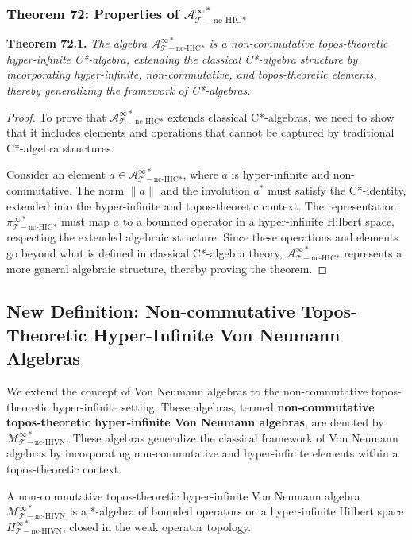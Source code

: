 \documentclass{article}
\begin{document}
\subsubsection{Theorem 72: Properties of \(\mathcal{A}_{\mathcal{T}-\text{nc-HIC*}}^{\infty *}\)}
\textbf{Theorem 72.1.} \textit{The algebra \(\mathcal{A}_{\mathcal{T}-\text{nc-HIC*}}^{\infty *}\) is a non-commutative topos-theoretic hyper-infinite C*-algebra, extending the classical C*-algebra structure by incorporating hyper-infinite, non-commutative, and topos-theoretic elements, thereby generalizing the framework of C*-algebras.}

\begin{proof}
To prove that \(\mathcal{A}_{\mathcal{T}-\text{nc-HIC*}}^{\infty *}\) extends classical C*-algebras, we need to show that it includes elements and operations that cannot be captured by traditional C*-algebra structures.

Consider an element \(a \in \mathcal{A}_{\mathcal{T}-\text{nc-HIC*}}^{\infty *}\), where \(a\) is hyper-infinite and non-commutative. The norm \(\|a\|\) and the involution \(a^*\) must satisfy the C*-identity, extended into the hyper-infinite and topos-theoretic context. The representation \(\pi_{\mathcal{T}-\text{nc-HIC*}}^{\infty *}\) must map \(a\) to a bounded operator in a hyper-infinite Hilbert space, respecting the extended algebraic structure. Since these operations and elements go beyond what is defined in classical C*-algebra theory, \(\mathcal{A}_{\mathcal{T}-\text{nc-HIC*}}^{\infty *}\) represents a more general algebraic structure, thereby proving the theorem.
\end{proof}

\subsection{New Definition: Non-commutative Topos-Theoretic Hyper-Infinite Von Neumann Algebras}
We extend the concept of Von Neumann algebras to the non-commutative topos-theoretic hyper-infinite setting. These algebras, termed \textbf{non-commutative topos-theoretic hyper-infinite Von Neumann algebras}, are denoted by \(\mathcal{M}_{\mathcal{T}-\text{nc-HIVN}}^{\infty *}\). These algebras generalize the classical framework of Von Neumann algebras by incorporating non-commutative and hyper-infinite elements within a topos-theoretic context.

A non-commutative topos-theoretic hyper-infinite Von Neumann algebra \(\mathcal{M}_{\mathcal{T}-\text{nc-HIVN}}^{\infty *}\) is a *-algebra of bounded operators on a hyper-infinite Hilbert space \(H_{\mathcal{T}-\text{nc-HIVN}}^{\infty *}\), closed in the weak operator topology.
\end{document}
